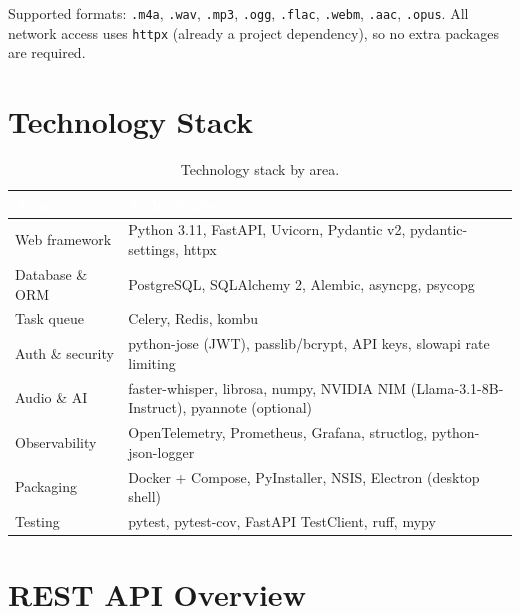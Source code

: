 \documentclass[11pt,a4paper]{article}
\begin{document}
Supported formats: \texttt{.m4a}, \texttt{.wav}, \texttt{.mp3}, \texttt{.ogg},
\texttt{.flac}, \texttt{.webm}, \texttt{.aac}, \texttt{.opus}. All network access uses
\texttt{httpx} (already a project dependency), so no extra packages are required.

\section{Technology Stack}

\begin{table}[htbp]
  \centering
  \small
  \begin{tabular}{@{}p{36mm}p{110mm}@{}}
    \toprule
    \rowcolor{tablehead}
    \textcolor{white}{\textbf{Area}} & \textcolor{white}{\textbf{Technologies}} \\
    \midrule
    Web framework & Python 3.11, FastAPI, Uvicorn, Pydantic v2, pydantic-settings, httpx \\
    Database \& ORM & PostgreSQL, SQLAlchemy 2, Alembic, asyncpg, psycopg \\
    Task queue & Celery, Redis, kombu \\
    Auth \& security & python-jose (JWT), passlib/bcrypt, API keys, slowapi rate limiting \\
    Audio \& AI & faster-whisper, librosa, numpy, NVIDIA NIM (Llama-3.1-8B-Instruct), pyannote (optional) \\
    Observability & OpenTelemetry, Prometheus, Grafana, structlog, python-json-logger \\
    Packaging & Docker + Compose, PyInstaller, NSIS, Electron (desktop shell) \\
    Testing & pytest, pytest-cov, FastAPI TestClient, ruff, mypy \\
    \bottomrule
  \end{tabular}
  \caption{Technology stack by area.}
\end{table}

\section{REST API Overview}
\end{document}
